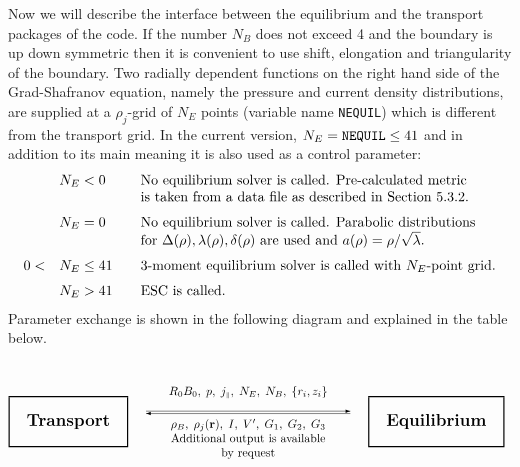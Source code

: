 Now we will describe the interface between the equilibrium and the
transport packages of the code.  
If the number $N_B$ does not exceed 4 and the boundary is up down
symmetric then it is convenient to use shift, elongation and
triangularity of the boundary. 
Two radially dependent functions on the right hand side of the
Grad-Shafranov equation, namely the pressure and current
density distributions, are supplied at a $\rho_j$-grid of $N_E$ points
(variable name {\tt NEQUIL}) which is different from the transport
grid. 
In the current version, $N_E={\tt NEQUIL}\leq 41$ and in addition to
its main meaning it is also used as a control parameter:
$$
\begin{array}{rll}
&N_E<0
	&\mbox{No equilibrium solver is called. Pre-calculated metric}\\
	&&\mbox{is taken from a data file as described in Section~5.3.2.}
\medskip\\
&N_E=0
	&\mbox{No equilibrium solver is called. Parabolic distributions}\\
	&&\mbox{for }\Delta(\rho),\lambda(\rho),\delta(\rho)
	\mbox{ are used and }a(\rho)=\rho/\sqrt{\lambda}.
\medskip\\
0 < &N_E\leq 41
	&\mbox{3-moment equilibrium solver is called with $N_E$-point grid.}
\medskip\\
&N_E>41\quad
	&\mbox{ESC is called.}
\end{array}
$$
Parameter exchange is shown in the following diagram and explained in
the table below. 
\vspace*{-25pt}
$$
\begin{array}{lcr}
\bigskip\\
\fboxrule=1pt\fboxsep=5mm
\hspace*{-5pt}\fbox{\Large\bf Transport}
&
\begin{array}{c}
R_0B_0,\;p,\;j_\pll,\;N_E,\;N_B,\;\{r_i,z_i\}\\
\vector( 1,0){172}\\[-10pt]
\vector(-1,0){172}\\
\rho_B,\;\rho_j({\bf r}),\;I,\;V',\;G_1,\;G_2,\;G_3\\
\mbox{\rm Additional output is available}\\
\mbox{\rm by request}
\end{array}
&
\fboxrule=1pt\fboxsep=5mm
\fbox{\Large\bf Equilibrium}
\bigskip\\
\end{array}
$$

